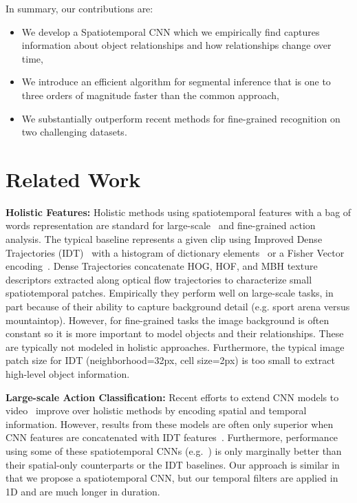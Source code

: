 \documentclass[runningheads]{llncs}
\newcommand{\fakesubsection}[1]{\smallskip\noindent\textbf{#1:}}
\begin{document}
In summary, our contributions are:
\begin{itemize}
\item We develop a Spatiotemporal CNN which we empirically find captures information about object relationships and how relationships change over time,
\item We introduce an efficient algorithm for segmental inference that is one to three orders of magnitude faster than the common approach,
\item We substantially outperform recent methods for fine-grained recognition on two challenging datasets.
\end{itemize}









 
\section{Related Work}
\label{sec:related}
\fakesubsection{Holistic Features}
Holistic methods using spatiotemporal features with a bag of words representation are standard for large-scale~\cite{wang_iccv_2013,wang_cvpr_2011,pirsiavash_cvpr_2014,jain_cvpr_2015} and fine-grained \cite{rohrbach_ijcv_2015,fathi_cvpr_2013,li_cvpr_2015,pirsiavash_cvpr_2014,pishchulin_gcpr_2014} action analysis. 
The typical baseline represents a given clip using Improved Dense Trajectories (IDT)~\cite{wang_iccv_2013} 
with a histogram of dictionary elements~\cite{rohrbach_ijcv_2015} or a Fisher Vector encoding~\cite{wang_iccv_2013}. 
Dense Trajectories concatenate HOG, HOF, and MBH texture descriptors extracted along optical flow trajectories to characterize small spatiotemporal patches. 
Empirically they perform well on large-scale tasks, in part because of their ability to capture background detail (e.g. sport arena versus mountaintop). However, for fine-grained tasks the image background is often constant so it is more important to model objects and their relationships. These are typically not modeled in holistic approaches.
Furthermore, the typical image patch size for IDT (neighborhood=32px, cell size=2px) is too small to extract high-level object information.

\fakesubsection{Large-scale Action Classification}
Recent efforts to extend CNN models to video~\cite{sun_iccv_2015,jain_cvpr_2015,karpathy_cvpr_2014,simonyan_nips_2014,tran_iccv_2015,peng_thumos_2015,ng_cvpr_2015} improve over holistic methods by encoding spatial and temporal information. However, results from these models are often only superior when CNN features are concatenated with IDT features~\cite{jain_cvpr_2015,tran_iccv_2015,peng_thumos_2015}.
Furthermore, performance using some of these spatiotemporal CNNs (e.g.~\cite{sun_iccv_2015,karpathy_cvpr_2014,ng_cvpr_2015}) is only marginally better than their spatial-only counterparts or the IDT baselines.
Our approach is similar in that we propose a spatiotemporal CNN, but our temporal filters are applied in 1D and are much longer in duration.
\end{document}
